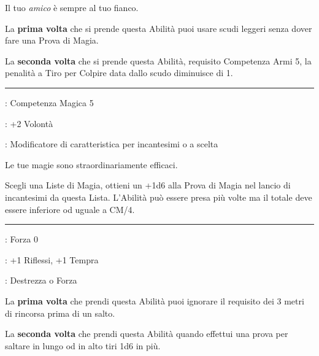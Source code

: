 \begin{multicols}{2}
Il tuo \emph{amico} è sempre al tuo fianco.

La \textbf{prima volta} che si prende questa Abilità puoi usare scudi leggeri senza dover fare una Prova di Magia.

La \textbf{seconda volta} che si prende questa Abilità, requisito Competenza Armi 5, la penalità a Tiro per Colpire data dallo scudo diminuisce di 1.

\smallskip\noindent\rule{\linewidth}{2pt} \hypertarget{Magie Potenti}{}\medskip{}
\noindent
\begin{description}[noitemsep, topsep=0pt, parsep=0pt, partopsep=0pt, leftmargin=0cm, labelwidth=2.5cm]
    \item[\textbf{Requisito}]: Competenza Magica 5
    \item[\textbf{Tiri Salvezza}]: +2 Volontà
    \item[\textbf{Caratteristica}]: Modificatore di caratteristica per incantesimi o a scelta
\end{description}

Le tue magie sono straordinariamente efficaci.

Scegli una Liste di Magia, ottieni un +1d6 alla Prova di Magia nel lancio di incantesimi da questa Lista. L'Abilità può essere presa più volte ma il totale deve essere inferiore od uguale a CM/4.

\smallskip\noindent\rule{\linewidth}{2pt} \hypertarget{Molla}{}\medskip{}
\noindent
\begin{description}[noitemsep, topsep=0pt, parsep=0pt, partopsep=0pt, leftmargin=0cm, labelwidth=2.5cm]
    \item[\textbf{Requisito}]: Forza 0
    \item[\textbf{Tiri Salvezza}]: +1 Riflessi, +1 Tempra
    \item[\textbf{Caratteristica}]: Destrezza o Forza
\end{description}

La \textbf{prima volta} che prendi questa Abilità puoi ignorare il requisito dei 3 metri di rincorsa prima di un salto.

La \textbf{seconda volta} che prendi questa Abilità quando effettui una prova per saltare in lungo od in alto tiri 1d6 in più.



\end{multicols}
